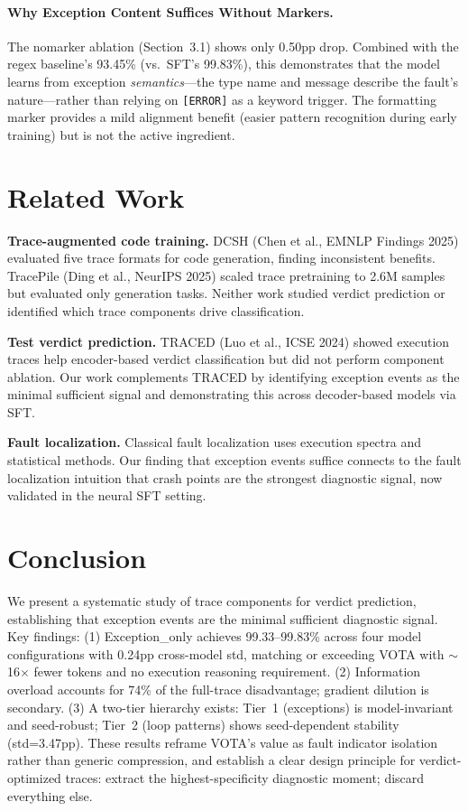 \documentclass[11pt]{article}
\begin{document}
\paragraph{Why Exception Content Suffices Without Markers.}
The nomarker ablation (Section~3.1) shows only 0.50pp drop. Combined with the regex baseline's 93.45\% (vs.\ SFT's 99.83\%), this demonstrates that the model learns from exception \emph{semantics}---the type name and message describe the fault's nature---rather than relying on \texttt{[ERROR]} as a keyword trigger. The formatting marker provides a mild alignment benefit (easier pattern recognition during early training) but is not the active ingredient.

\section{Related Work}

\textbf{Trace-augmented code training.} DCSH (Chen et al., EMNLP Findings 2025) evaluated five trace formats for code generation, finding inconsistent benefits. TracePile (Ding et al., NeurIPS 2025) scaled trace pretraining to 2.6M samples but evaluated only generation tasks. Neither work studied verdict prediction or identified which trace components drive classification.

\textbf{Test verdict prediction.} TRACED (Luo et al., ICSE 2024) showed execution traces help encoder-based verdict classification but did not perform component ablation. Our work complements TRACED by identifying exception events as the minimal sufficient signal and demonstrating this across decoder-based models via SFT.

\textbf{Fault localization.} Classical fault localization uses execution spectra and statistical methods. Our finding that exception events suffice connects to the fault localization intuition that crash points are the strongest diagnostic signal, now validated in the neural SFT setting.

\section{Conclusion}

We present a systematic study of trace components for verdict prediction, establishing that exception events are the minimal sufficient diagnostic signal. Key findings: (1) Exception\_only achieves 99.33--99.83\% across four model configurations with 0.24pp cross-model std, matching or exceeding VOTA with $\sim$16$\times$ fewer tokens and no execution reasoning requirement. (2) Information overload accounts for 74\% of the full-trace disadvantage; gradient dilution is secondary. (3) A two-tier hierarchy exists: Tier~1 (exceptions) is model-invariant and seed-robust; Tier~2 (loop patterns) shows seed-dependent stability (std=3.47pp). These results reframe VOTA's value as fault indicator isolation rather than generic compression, and establish a clear design principle for verdict-optimized traces: extract the highest-specificity diagnostic moment; discard everything else.
\end{document}
